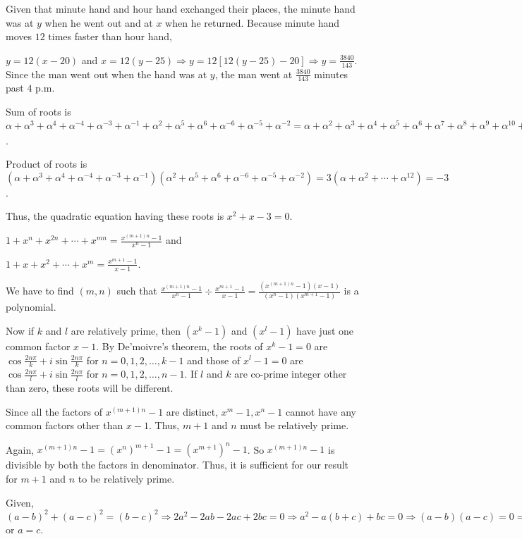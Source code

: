   Given that minute hand and hour hand exchanged their places, the minute hand was at $y$ when he went out
  and at $x$ when he returned. Because minute hand moves $12$ times faster than hour hand,

  $y = 12(x - 20)$ and $x = 12(y - 25)\Rightarrow y = 12[12(y - 25) - 20]\Rightarrow y =
  \frac{3840}{143}$. Since the man went out when the hand was at $y$, the man went at $\frac{3840}{143}$
  minutes past $4$ p.m.
\item Sum of roots is $\alpha + \alpha^3 + \alpha^4 + \alpha^{-4} + \alpha^{-3} + \alpha^{-1}  + \alpha^2 +
  \alpha^5 + \alpha^6 + \alpha^{-6} + \alpha^{-5} + \alpha^{-2} = \alpha + \alpha^2 + \alpha^3 + \alpha^4 +
  \alpha^5 + \alpha^6 + \alpha^7 + \alpha^8 + \alpha^9 + \alpha^{10} + \alpha^{11} + \alpha^{12}\;(\because
  \alpha^{13} = 1) = (1 + \alpha + \alpha^2 + \cdots + \alpha^{12}) - 1 = \frac{1 - \alpha^{13}}{1 - \alpha}
  - 1 = -1$.

  Product of roots is $(\alpha + \alpha^3 + \alpha^4 + \alpha^{-4} + \alpha^{-3} + \alpha^{-1})(\alpha^2 +
  \alpha^5 + \alpha^6 + \alpha^{-6} + \alpha^{-5} + \alpha^{-2}) = 3(\alpha + \alpha^2 + \cdots +
  \alpha^{12}) = -3$.

  Thus, the quadratic equation having these roots is $x^2 + x - 3 = 0$.
\item $1 + x^n + x^{2n} + \cdots + x^{mn} = \frac{x^{(m + 1)n} - 1}{x^n - 1}$ and

  $1 + x + x^2 + \cdots + x^m = \frac{x^{m + 1} - 1}{x - 1}$.

  We have to find $(m, n)$ such that $\frac{x^{(m + 1)n} - 1}{x^n - 1}\div \frac{x^{m + 1} - 1}{x - 1} =
  \frac{(x^{(m + 1)n} - 1)(x - 1)}{(x^n - 1)(x^{m + 1} - 1)}$ is a polynomial.

  Now if $k$ and $l$ are relatively prime, then $(x^k - 1)$ and $(x^l - 1)$ have just one common factor $x -
  1$. By De'moivre's theorem, the roots of $x^k - 1 = 0$ are $\cos\frac{2n\pi}{k} + i\sin\frac{2n\pi}{k}$
  for $n = 0, 1, 2, \ldots, k - 1$ and those of $x^l - 1 = 0$ are $\cos\frac{2n\pi}{l} +
  i\sin\frac{2n\pi}{l}$ for $n = 0, 1, 2, \ldots, n - 1$. If $l$ and $k$ are co-prime integer other than
  zero, these roots will be different.

  Since all the factors of $x^{(m + 1)n} - 1$ are distinct, $x^m - 1, x^n - 1$ cannot have any common
  factors other than $x - 1$. Thus, $m + 1$ and $n$ must be relatively prime.

  Again, $x^{(m + 1)n} - 1 = (x^{n})^{m + 1} - 1 = (x^{m + 1})^n - 1$. So $x^{(m + 1)n} - 1$ is divisible by
  both the factors in denominator. Thus, it is sufficient for our result for $m + 1$ and $n$ to be
  relatively prime.
\item Given, $(a - b)^2 + (a - c)^2 = (b - c)^2 \Rightarrow 2a^2 - 2ab - 2ac + 2bc = 0 \Rightarrow a^2 - a(b
  + c) + bc = 0 \Rightarrow (a - b)(a - c) = 0 \Rightarrow a = b$ or $a = c$.

